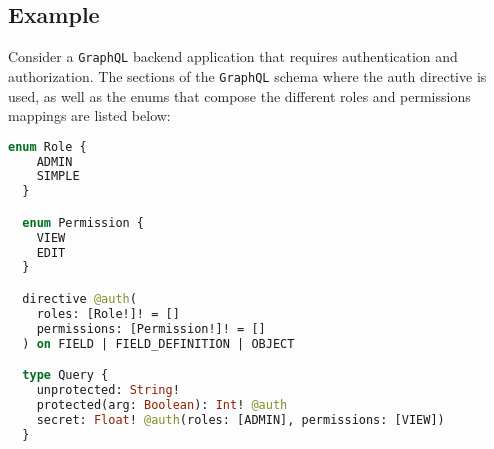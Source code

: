 \subsection{Example}
\label{subsec:corollary_projects_graphql_auth_diretive_example}

Consider a \texttt{GraphQL} backend application that requires authentication and
authorization. The sections of the \texttt{GraphQL} schema where the auth
directive is used, as well as the enums that compose the different roles and permissions
mappings are listed below:

\begin{lstlisting}[language=graphql, xleftmargin=\parindent, caption=\texttt{GraphQL} schema with auth directive and mappings]
  enum Role {
    ADMIN
    SIMPLE
  }

  enum Permission {
    VIEW
    EDIT
  }

  directive @auth(
    roles: [Role!]! = []
    permissions: [Permission!]! = []
  ) on FIELD | FIELD_DEFINITION | OBJECT

  type Query {
    unprotected: String!
    protected(arg: Boolean): Int! @auth
    secret: Float! @auth(roles: [ADMIN], permissions: [VIEW])
  }
\end{lstlisting}

